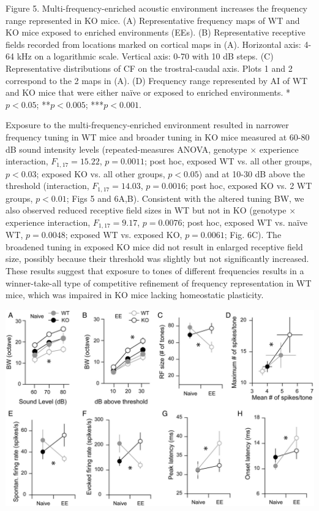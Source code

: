 \begin{changemargin}{1in}{1in}
\footnotesize{Figure 5. Multi-frequency-enriched acoustic environment increases the frequency range represented in KO mice. (A) Representative frequency maps of WT and KO mice exposed to enriched environments (EEs). (B) Representative receptive fields recorded from locations marked on cortical maps in (A). Horizontal axis: 4-64 kHz on a logarithmic scale. Vertical axis: 0-70 with 10 dB steps. (C) Representative distributions of CF on the trostral-caudal axis. Plots 1 and 2 correspond to the 2 maps in (A). (D) Frequency range represented by AI of WT and KO mice that were either na\"ive or exposed to enriched environments. *$p<0.05$; **$p<0.005$; ***$p<0.001$.}
\end{changemargin}

Exposure to the multi-frequency-enriched environment resulted in narrower frequency tuning in WT mice and broader tuning in KO mice measured at 60-80 dB sound intensity levels (repeated-measures ANOVA, genotype $\times$ experience interaction, $F_{1,17}=15.22$, $p=0.0011$; post hoc, exposed WT vs. all other groups, $p<0.03$; exposed KO vs. all other groups, $p<0.05$) and at 10-30 dB above the threshold (interaction, $F_{1,17}=14.03$, $p=0.0016$; post hoc, exposed KO vs. 2 WT groups, $p<0.01$; Figs 5 and 6A,B). Consistent with the altered tuning BW, we also observed reduced receptive field sizes in WT but not in KO (genotype $\times$ experience interaction, $F_{1,17}=9.17$, $p=0.0076$; post hoc, exposed WT vs. na\"ive WT, $p=0.0048$; exposed WT vs. exposed KO, $p=0.0061$; Fig. 6C). The broadened tuning in exposed KO mice did not result in enlarged receptive field size, possibly because their threshold was slightly but not significantly increased. These results suggest that exposure to tones of different frequencies results in a winner-take-all type of competitive refinement of frequency representation in WT mice, which was impaired in KO mice lacking homeostatic plasticity.

\vspace{2\baselineskip}

\centerline{\includegraphics{images/C3F6}}

